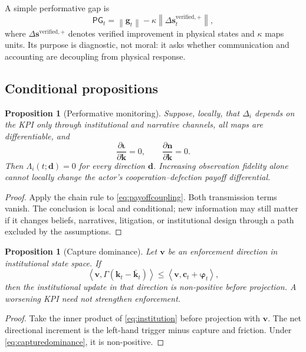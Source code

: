 \documentclass[11pt,a4paper]{article}
\numberwithin{equation}{section}
\theoremstyle{definition}
\theoremstyle{plain}
\newtheorem{proposition}[definition]{Proposition}
\theoremstyle{remark}
\newcommand{\kpi}{\bm{k}}
\newcommand{\capture}{\bm{c}}
\newcommand{\inst}{\bm{\iota}}
\newcommand{\narr}{\bm{n}}
\begin{document}
A simple performative gap is
\begin{equation}
\mathsf{PG}_t=
\left\|\bm{g}_t\right\|
-\kappa\left\|\Delta\bm{s}_t^{\mathrm{verified,+}}\right\|,
\label{eq:performativegap}
\end{equation}
where $\Delta\bm{s}^{\mathrm{verified,+}}$ denotes verified improvement in physical states and $\kappa$ maps units. Its purpose is diagnostic, not moral: it asks whether communication and accounting are decoupling from physical response.

\subsection{Conditional propositions}

\begin{proposition}[Performative monitoring]
Suppose, locally, that $\Delta_i$ depends on the KPI only through institutional and narrative channels, all maps are differentiable, and
\[
\frac{\partial \inst}{\partial \kpi}=0,
\qquad
\frac{\partial \narr}{\partial \kpi}=0.
\]
Then $\Lambda_i(t;\bm d)=0$ for every direction $\bm d$. Increasing observation fidelity alone cannot locally change the actor's cooperation--defection payoff differential.
\end{proposition}

\begin{proof}
Apply the chain rule to \cref{eq:payoffcoupling}. Both transmission terms vanish. The conclusion is local and conditional; new information may still matter if it changes beliefs, narratives, litigation, or institutional design through a path excluded by the assumptions.
\end{proof}

\begin{proposition}[Capture dominance]
Let $\bm{v}$ be an enforcement direction in institutional state space. If
\begin{equation}
\left\langle \bm{v},\Gamma(\kpi_t-\bar{\kpi}_t)\right\rangle
\le
\left\langle \bm{v},\capture_t+\bm{\varphi}_t\right\rangle,
\label{eq:capturedominance}
\end{equation}
then the institutional update in that direction is non-positive before projection. A worsening KPI need not strengthen enforcement.
\end{proposition}

\begin{proof}
Take the inner product of \cref{eq:institution} before projection with $\bm{v}$. The net directional increment is the left-hand trigger minus capture and friction. Under \cref{eq:capturedominance}, it is non-positive.
\end{proof}
\end{document}
